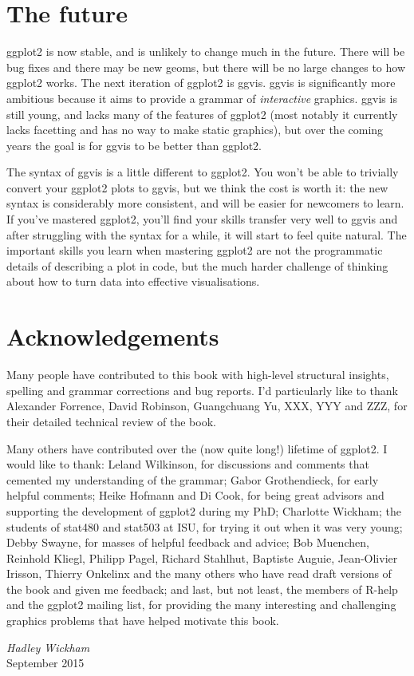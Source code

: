 \section*{The future}

ggplot2 is now stable, and is unlikely to change much in the future.
There will be bug fixes and there may be new geoms, but there will be no
large changes to how ggplot2 works. The next iteration of ggplot2 is
ggvis. ggvis is significantly more ambitious because it aims to provide
a grammar of \emph{interactive} graphics. ggvis is still young, and
lacks many of the features of ggplot2 (most notably it currently lacks
facetting and has no way to make static graphics), but over the coming
years the goal is for ggvis to be better than ggplot2.

The syntax of ggvis is a little different to ggplot2. You won't be able
to trivially convert your ggplot2 plots to ggvis, but we think the cost
is worth it: the new syntax is considerably more consistent, and will be
easier for newcomers to learn. If you've mastered ggplot2, you'll find
your skills transfer very well to ggvis and after struggling with the
syntax for a while, it will start to feel quite natural. The important
skills you learn when mastering ggplot2 are not the programmatic details
of describing a plot in code, but the much harder challenge of thinking
about how to turn data into effective visualisations.

\section*{Acknowledgements}

Many people have contributed to this book with high-level structural
insights, spelling and grammar corrections and bug reports. I'd
particularly like to thank Alexander Forrence, David Robinson,
Guangchuang Yu, XXX, YYY and ZZZ, for their detailed technical review of
the book.

Many others have contributed over the (now quite long!) lifetime of
ggplot2. I would like to thank: Leland Wilkinson, for discussions and
comments that cemented my understanding of the grammar; Gabor
Grothendieck, for early helpful comments; Heike Hofmann and Di Cook, for
being great advisors and supporting the development of ggplot2 during my
PhD; Charlotte Wickham; the students of stat480 and stat503 at ISU, for
trying it out when it was very young; Debby Swayne, for masses of
helpful feedback and advice; Bob Muenchen, Reinhold Kliegl, Philipp
Pagel, Richard Stahlhut, Baptiste Auguie, Jean-Olivier Irisson, Thierry
Onkelinx and the many others who have read draft versions of the book
and given me feedback; and last, but not least, the members of R-help
and the ggplot2 mailing list, for providing the many interesting and
challenging graphics problems that have helped motivate this book.

\vspace{\baselineskip}\begin{flushright}\noindent
{\it Hadley Wickham}\\
September 2015\\
\end{flushright}
